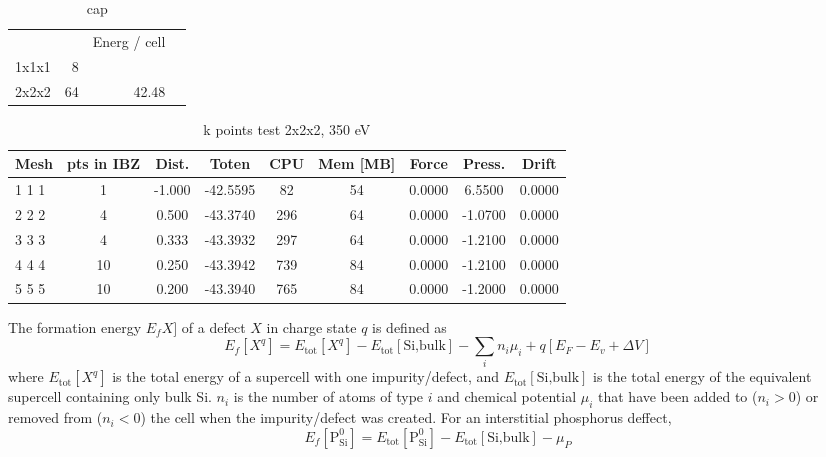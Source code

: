 \documentclass[11pt,bibliography=totoc,index=totoc]{scrbook}   %
\begin{document}
\begin{table}[htbp]
  \centering
  \begin{tabular}{lrrr}
          &     & Energ / cell  \\
    1x1x1 &   8 &               \\
    2x2x2 &  64 & 42.48         \\
  \end{tabular}
  \caption{cap}
  \label{tab:supertests}
\end{table}


\begin{table}[htbp]
  \centering
  \begin{tabular}{lcccccccc}\toprule
    Mesh	& pts in IBZ    & Dist. & Toten     & CPU	& Mem [MB]  & Force	    & Press.	& Drift  \\\midrule
    1 1 1	&  1    	    &-1.000	& -42.5595	& 82	& 54        & 0.0000	& 6.5500	& 0.0000 \\
    2 2 2	&  4    	    & 0.500	& -43.3740	& 296	& 64        & 0.0000	& -1.0700	& 0.0000 \\
    3 3 3	&  4    	    & 0.333	& -43.3932	& 297   & 64        & 0.0000	& -1.2100	& 0.0000 \\
    4 4 4	& 10    	    & 0.250	& -43.3942	& 739	& 84        & 0.0000	& -1.2100	& 0.0000 \\
    5 5 5	& 10	        & 0.200	& -43.3940	& 765	& 84        & 0.0000	& -1.2000	& 0.0000 \\\bottomrule
  \end{tabular}
  \caption{k points test 2x2x2, 350 eV}
  \label{tab:ktest2}
\end{table}


The formation energy $E_fX]$ of a defect $X$ in charge state $q$ is defined as 
\begin{equation}
  E_f[X^q] = E_{\text{tot}}[X^q] - E_{\text{tot}}[\text{Si,bulk}] -  \sum_i n_i \mu_i + q [ E_F - E_v + \Delta V ]
\end{equation}
where $E_{\text{tot}}[X^q]$ is the total energy of a supercell with one impurity/defect,
and $E_{\text{tot}}[\text{Si,bulk}]$ is the total energy of the equivalent supercell containing only bulk Si. 
$n_i$ is the number of atoms of type $i$ and chemical potential $\mu_i$ that have been added to ($n_i>0$) or removed from ($n_i<0$) the cell when the impurity/defect was created. For an interstitial phosphorus deffect,
\begin{equation}
  E_f[\text{P}_{\text{Si}}^0] = E_{\text{tot}}[\text{P}_{\text{Si}}^0] - E_{\text{tot}}[\text{Si,bulk}] - \mu_P
\end{equation}
\end{document}
